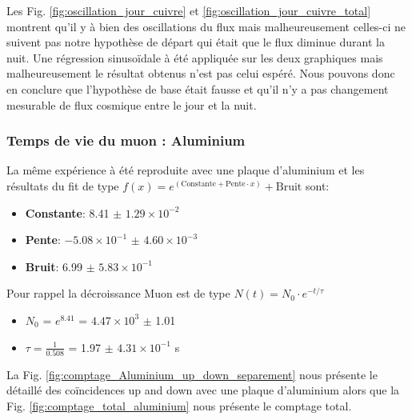 \documentclass[12pt]{article}
\begin{document}
Les Fig. \ref{fig:oscillation_jour_cuivre} et \ref{fig:oscillation_jour_cuivre_total} montrent qu'il y à bien des oscillations du flux mais malheureusement celles-ci ne suivent pas notre hypothèse de départ qui était que le flux diminue durant la nuit. Une régression sinusoïdale à été appliquée sur les deux graphiques mais malheureusement le résultat obtenus n'est pas celui espéré. Nous pouvons donc en conclure que l'hypothèse de base était fausse et qu'il n'y a pas changement mesurable de flux cosmique entre le jour et la nuit.


\newpage
\subsubsection{Temps de vie du muon : Aluminium}

La même expérience à été reproduite avec une plaque d'aluminium et les résultats du fit de type $f(x) = e^{(\text{Constante}+\text{Pente}\cdot x)}+\text{Bruit}$ sont: 

\begin{itemize}
    \item \textbf{Constante}: 8.41 $\pm$ $1.29\times10^{-2}$
    \item \textbf{Pente}: $-5.08\times10^{-1}$ $\pm$ $4.60\times10^{-3}$
    \item \textbf{Bruit}: 6.99 $\pm$ $5.83\times10^{-1}$
\end{itemize}
    
Pour rappel la décroissance Muon est de type $N(t) = N_{0}\cdot e^{-t/\tau}$
\begin{itemize}
    \item $N_{0}$ = $e^{8.41}$ = $4.47\times10^{3}$ $\pm$ 1.01
    \item $\tau=\frac{1}{0.508}$ = 1.97 $\pm$ $4.31\times10^{-1}$ \SIUnitSymbolMicro s
\end{itemize}


La Fig. \ref{fig:comptage_Aluminium_up_down_separement} nous présente le détaillé des coïncidences up and down avec une plaque d'aluminium alors que la Fig. \ref{fig:comptage_total_aluminium} nous présente le comptage total.
\end{document}

